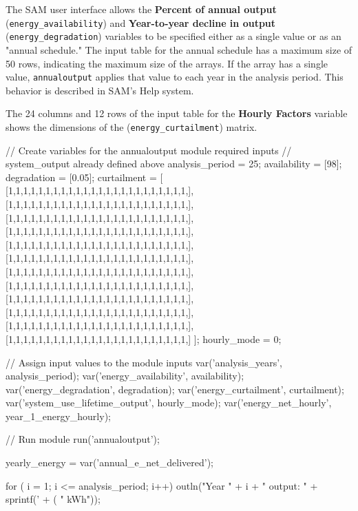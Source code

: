 \documentclass{scrartcl} %
\newcommand{\+}{\discretionary{\mbox{\scriptsize$\hookleftarrow$}}{}{}}
\begin{document}
The SAM user interface allows the \textbf{Percent of annual output} (\texttt{energy\_availability}) and \textbf{Year-to-year decline in output} (\texttt{energy\_degradation}) variables to be specified either as a single value or as an "annual schedule." The input table for the annual schedule has a maximum size of 50 rows, indicating the maximum size of the arrays. If the array has a single value, \texttt{annualoutput} applies that value to each year in the analysis period. This behavior is described in SAM's Help system.

The 24 columns and 12 rows of the input table for the \textbf{Hourly Factors} variable shows the dimensions of the (\texttt{energy\_curtailment}) matrix.

\begin{verbatimtab}

// Create variables for the annualoutput module required inputs
// system_output already defined above
analysis_period = 25;
availability = [98];
degradation = [0.05];
curtailment = [ [1,1,1,1,1,1,1,1,1,1,1,1,1,1,1,1,1,1,1,1,1,1,1,1,],
                [1,1,1,1,1,1,1,1,1,1,1,1,1,1,1,1,1,1,1,1,1,1,1,1,],
                [1,1,1,1,1,1,1,1,1,1,1,1,1,1,1,1,1,1,1,1,1,1,1,1,],
                [1,1,1,1,1,1,1,1,1,1,1,1,1,1,1,1,1,1,1,1,1,1,1,1,],
                [1,1,1,1,1,1,1,1,1,1,1,1,1,1,1,1,1,1,1,1,1,1,1,1,],
                [1,1,1,1,1,1,1,1,1,1,1,1,1,1,1,1,1,1,1,1,1,1,1,1,],
                [1,1,1,1,1,1,1,1,1,1,1,1,1,1,1,1,1,1,1,1,1,1,1,1,],
                [1,1,1,1,1,1,1,1,1,1,1,1,1,1,1,1,1,1,1,1,1,1,1,1,],
                [1,1,1,1,1,1,1,1,1,1,1,1,1,1,1,1,1,1,1,1,1,1,1,1,],
                [1,1,1,1,1,1,1,1,1,1,1,1,1,1,1,1,1,1,1,1,1,1,1,1,],
                [1,1,1,1,1,1,1,1,1,1,1,1,1,1,1,1,1,1,1,1,1,1,1,1,],
                [1,1,1,1,1,1,1,1,1,1,1,1,1,1,1,1,1,1,1,1,1,1,1,1,] ];
hourly_mode = 0;

// Assign input values to the module inputs
var('analysis_years', analysis_period);
var('energy_availability', availability);
var('energy_degradation', degradation);
var('energy_curtailment', curtailment);
var('system_use_lifetime_output', hourly_mode);
var('energy_net_hourly', year_1_energy_hourly);

// Run module
run('annualoutput');

yearly_energy = var('annual_e_net_delivered');

for ( i = 1; i <= analysis_period; i++)
{
  outln("Year " + i + " output: " + sprintf('%
                                            + ( " kWh"));
}


\end{verbatimtab}
\end{document}
